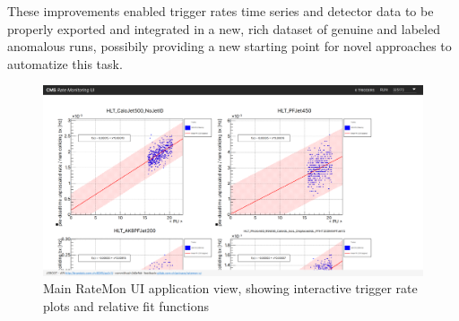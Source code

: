 \documentclass[a4, oneside, 10pt, nobib]{memoir}
\begin{document}
		These improvements enabled trigger rates time series and detector data to be properly exported and integrated in a new, rich dataset of genuine and labeled anomalous runs, possibily providing a new starting point for novel approaches to automatize this task.

\begin{figure}
    \centerline{
        \includegraphics[width=0.9\paperwidth]{figures/ratemon-ui0.png}}
    \caption{Main RateMon UI application view, showing interactive trigger rate plots and relative fit functions}
    \label{fig:ratemon_ui0}
\end{figure}
 
\printbibliography
\thispagestyle{empty}
\end{document}
